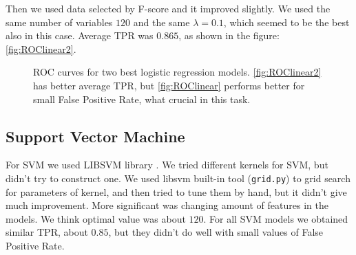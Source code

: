 \documentclass[]{report}
\begin{document}
Then we used data selected by F-score and it improved slightly. We used the same number of variables $120$ and the same $\lambda = 0.1$, which seemed to be the best also in this case. Average TPR was $0.865$, as shown in the figure: \ref{fig:ROClinear2}.
  \begin{figure}[h]
    \center
    \caption{ROC curves for two best logistic regression models. \ref{fig:ROClinear2} has better average TPR, but \ref{fig:ROClinear} performs better for small False Positive Rate, what crucial in this task.}
  \end{figure}

\subsection{Support Vector Machine}
For SVM we used LIBSVM library \cite{libsvm}.
We tried different kernels for SVM, but didn't try to construct  one. We used libsvm built-in tool (\texttt{grid.py}) to grid search for parameters of kernel, and then tried to tune them by hand, but it didn't give much improvement. More significant was changing amount of features in the models. We think optimal value was about $120$. For all SVM models we obtained similar TPR, about $0.85$, but they didn't do well with small values of False Positive Rate.
\end{document}
